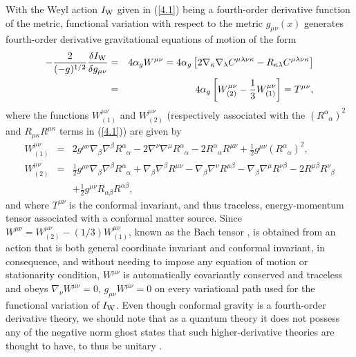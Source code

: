 With the Weyl action $I_{\rm W}$ given in  (\ref{4.1}) being a fourth-order derivative function of the metric, functional variation with respect to the metric $g_{\mu\nu}(x)$ generates fourth-order derivative gravitational equations of motion of the form \cite{mannheim_2006} 
%
\begin{eqnarray}
-\frac{2}{(-g)^{1/2}}\frac{\delta I_{\rm W}}{\delta g_{\mu\nu}}&=&4\alpha_g W^{\mu\nu}=4\alpha_g\left[2\nabla_{\kappa}\nabla_{\lambda}C^{\mu\lambda\nu\kappa}-
R_{\kappa\lambda}C^{\mu\lambda\nu\kappa}\right]
\nonumber\\
&=&4\alpha_g\left[W^{\mu
	\nu}_{(2)}-\frac{1}{3}W^{\mu\nu}_{(1)}\right]=T^{\mu\nu},
\label{4.3}
\end{eqnarray}
% 
where the functions $W^{\mu \nu}_{(1)}$ and $W^{\mu \nu}_{(2)}$ (respectively associated with the $(R^{\alpha}_{\phantom{\alpha}\alpha})^2$ and $R_{\mu\kappa}R^{\mu\kappa}$ terms in (\ref{4.1})) are given by
%                                                                               
\begin{eqnarray}
W^{\mu \nu}_{(1)}&=&
2g^{\mu\nu}\nabla_{\beta}\nabla^{\beta}R^{\alpha}_{\phantom{\alpha}\alpha}                                             
-2\nabla^{\nu}\nabla^{\mu}R^{\alpha}_{\phantom{\alpha}\alpha}                          
-2 R^{\alpha}_{\phantom{\alpha}\alpha}R^{\mu\nu}                              
+\frac{1}{2}g^{\mu\nu}(R^{\alpha}_{\phantom{\alpha}\alpha})^2,
\nonumber\\
W^{\mu \nu}_{(2)}&=&
\frac{1}{2}g^{\mu\nu}\nabla_{\beta}\nabla^{\beta}R^{\alpha}_{\phantom{\alpha}\alpha}
+\nabla_{\beta}\nabla^{\beta}R^{\mu\nu}                    
-\nabla_{\beta}\nabla^{\nu}R^{\mu\beta}                       
-\nabla_{\beta}\nabla^{\mu}R^{\nu \beta}                          
- 2R^{\mu\beta}R^{\nu}_{\phantom{\nu}\beta}
\nonumber\\
&&+\frac{1}{2}g^{\mu\nu}R_{\alpha\beta}R^{\alpha\beta},
\label{4.4}
\end{eqnarray}                                 
%
and where $T^{\mu\nu}$ is the conformal invariant, and thus traceless, energy-momentum tensor associated with a conformal matter source.  Since $W^{\mu\nu}=W^{\mu
	\nu}_{(2)}-(1/3)W^{\mu\nu}_{(1)}$, known as the Bach tensor \cite{bach_1921},  is obtained from an action that is both general coordinate invariant and conformal invariant, in consequence, and without needing to impose any equation of motion or stationarity condition, $W^{\mu\nu}$ is automatically covariantly conserved and traceless and obeys $\nabla_{\nu}W^{\mu\nu}=0$, $g_{\mu\nu}W^{\mu\nu}=0$ on every variational path used for the functional variation of $I_{\rm W}$. Even though conformal gravity is a fourth-order derivative theory, we should note that as a quantum theory  it does not possess any of the negative norm ghost states that such higher-derivative theories are thought to have, to thus be unitary  \cite{bender_mannheim_2008a}. 

